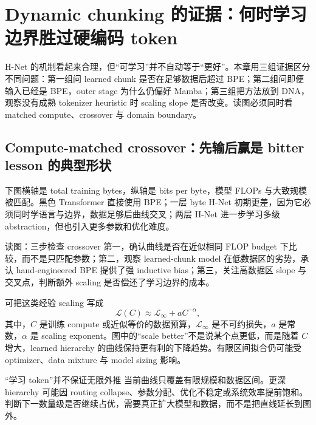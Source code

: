 \section{Dynamic chunking 的证据：何时学习边界胜过硬编码 token}

H-Net 的机制看起来合理，但“可学习”并不自动等于“更好”。本章用三组证据区分不同问题：第一组问 learned chunk 是否在足够数据后超过 BPE；第二组问即便输入已经是 BPE，outer stage 为什么仍偏好 Mamba；第三组把方法放到 DNA，观察没有成熟 tokenizer heuristic 时 scaling slope 是否改变。读图必须同时看 matched compute、crossover 与 domain boundary。

\subsection{Compute-matched crossover：先输后赢是 bitter lesson 的典型形状}

下图横轴是 total training bytes，纵轴是 bits per byte，模型 FLOPs 与大致规模被匹配。黑色 Transformer 直接使用 BPE；一层 byte H-Net 初期更差，因为它必须同时学语言与边界，数据足够后曲线交叉；两层 H-Net 进一步学习多级 abstraction，但也引入更多参数和优化难度。


\begin{knowledgebox}{读图：三步检查 crossover}
第一，确认曲线是否在近似相同 FLOP budget 下比较，而不是只匹配参数；第二，观察 learned-chunk model 在低数据区的劣势，承认 hand-engineered BPE 提供了强 inductive bias；第三，关注高数据区 slope 与交叉点，判断额外 scaling 是否偿还了学习边界的成本。
\end{knowledgebox}

可把这类经验 scaling 写成
\[
\mathcal{L}(C)\approx \mathcal{L}_\infty + aC^{-\alpha},
\]
其中，$C$ 是训练 compute 或近似等价的数据预算，$\mathcal{L}_\infty$ 是不可约损失，$a$ 是常数，$\alpha$ 是 scaling exponent。图中的“scale better”不是说某个点更低，而是随着 $C$ 增大，learned hierarchy 的曲线保持更有利的下降趋势。有限区间拟合仍可能受 optimizer、data mixture 与 model sizing 影响。


\begin{warningbox}{“学习 token”并不保证无限外推}
当前曲线只覆盖有限规模和数据区间。更深 hierarchy 可能因 routing collapse、参数分配、优化不稳定或系统效率提前饱和。判断下一数量级是否继续占优，需要真正扩大模型和数据，而不是把直线延长到图外。
\end{warningbox}

